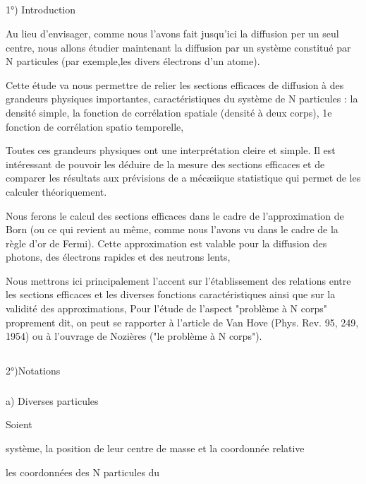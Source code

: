 \subsection{}%
1°) Introduction

Au lieu d'envisager, comme nous l'avons fait jusqu'ici la diffusion per un seul
centre, nous allons étudier maintenant la diffusion par
un système constitué par N particules (par exemple,les divers électrons d'un
atome).

Cette étude va nous permettre de relier les sections efficaces
de diffusion à des grandeurs physiques importantes, caractéristiques du système de
N particules : la densité simple, la fonction de corrélation spatiale
(densité à deux corps), 1e fonction de corrélation spatio temporelle,

Toutes ces grandeurs physiques ont une interprétation cleire et
simple. Il est intéressant de pouvoir les déduire de la mesure des sections
efficaces et de comparer les résultats aux prévisions de a mécæiique statistique
qui permet de les calculer théoriquement.

Nous ferons le calcul des sections efficaces dans le cadre de
l'approximation de Born (ou ce qui revient au même, comme nous l'avons vu dans
le cadre de la règle d'or de Fermi). Cette approximation est valable pour la
diffusion des photons, des électrons rapides et des neutrons lents,

Nous mettrons ici principalement l'accent sur l'établissement
des relations entre les sections efficaces et les diverses fonctions
caractéristiques ainsi que sur la validité des approximations, Pour
l'étude de l'aspect "problème à N corps" proprement dit, on peut se rapporter à l'article de
Van Hove (Phys. Rev. 95, 249, 1954) ou à l'ouvrage de Nozières ("le problème
à N corps").


\subsection{}%
2°)Notations

\subsubsection{}%
a) Diverses particules

Soient

système,  la position de leur centre de masse et  la coordonnée relative

les coordonnées des N particules du

